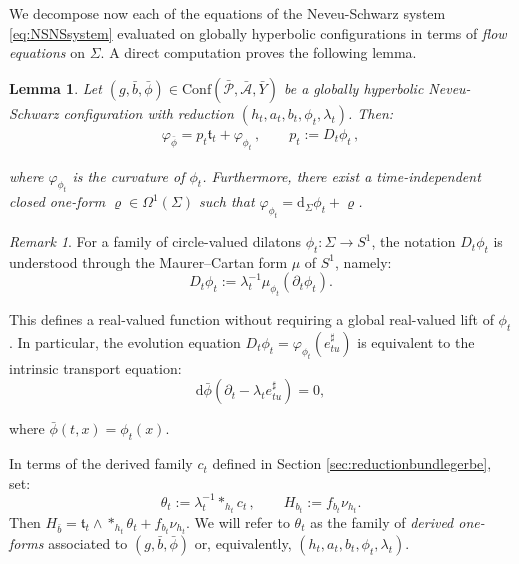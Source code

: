 \documentclass[10pt,reqno,a4paper]{amsart}
\theoremstyle{plain}
\newtheorem{lemma}[thm]{Lemma}
\theoremstyle{definition}
\theoremstyle{remark}
\newtheorem{remark}[thm]{Remark}
\theoremstyle{remark}
\def\dd{\mathrm{d}}
\def\Conf{\mathrm{Conf}}
\def\cA{\mathcal{A}}
\def\cP{\mathcal{P}}
\renewcommand{\(}{ (}
\renewcommand{\)}{ )}
\begin{document}
\noindent
We decompose now each of the equations of the Neveu-Schwarz system \eqref{eq:NSNSsystem} evaluated on globally hyperbolic configurations in terms of \emph{flow equations} on $\Sigma$. A direct computation proves the following lemma.

\begin{lemma}
Let $(g,\bar{b},\bar{\phi})\in \Conf(\bar{\cP},\bar{\cA},\bar{Y})$ be a globally hyperbolic Neveu-Schwarz configuration with reduction $( h_t , a_t , b_t , \phi_t,\lambda_t)$. Then:
\begin{eqnarray*}
\varphi_{\bar{\phi}} = p_t\mathfrak{t}_t + \varphi_{\phi_t}\, , \qquad p_t:= D_t\phi_t\, ,  
\end{eqnarray*}
	
\noindent
where $\varphi_{\phi_t}$ is the curvature of $\phi_t$. Furthermore, there exist a time-independent closed one-form $\varrho \in \Omega^1(\Sigma)$ such that $\varphi_{\phi_t} = \dd_{\Sigma} \phi_t + \varrho$.
\end{lemma} 

\begin{remark}
For a family of circle-valued dilatons $\phi_t\colon\Sigma\to S^1$, the notation $D_t\phi_t$ is understood through the Maurer--Cartan form $\mu$ of $S^1$, namely:
\begin{equation*}
D_t\phi_t:=\lambda_t^{-1}\mu_{\phi_t}(\partial_t\phi_t).
\end{equation*}

\noindent
This defines a real-valued function without requiring a global real-valued lift of $\phi_t$. In particular, the evolution equation $D_t\phi_t=\varphi_{\phi_t}(e^{\sharp}_{tu})$ is equivalent to the intrinsic transport equation:
\begin{equation*}
\dd\bar{\phi} (\partial_t-\lambda_t e^{\sharp}_{tu} )=0,
\end{equation*}

\noindent
where $\bar{\phi}(t,x)=\phi_t(x)$.
\end{remark} 

\noindent
In terms of the derived family $c_t$ defined in Section \ref{sec:reductionbundlegerbe}, set:
\begin{equation*}
\theta_t:=\lambda_t^{-1}\ast_{h_t}c_t\, , \qquad H_{b_t}:=f_{b_t}\nu_{h_t}.
\end{equation*}
Then $H_{\bar b}=\mathfrak{t}_t\wedge\ast_{h_t}\theta_t+f_{b_t}\nu_{h_t}$. We will refer to $\theta_t$ as the family of \emph{derived one-forms} associated to $(g,\bar{b},\bar{\phi})$ or, equivalently, $( h_t , a_t , b_t , \phi_t,\lambda_t)$.
\end{document}
